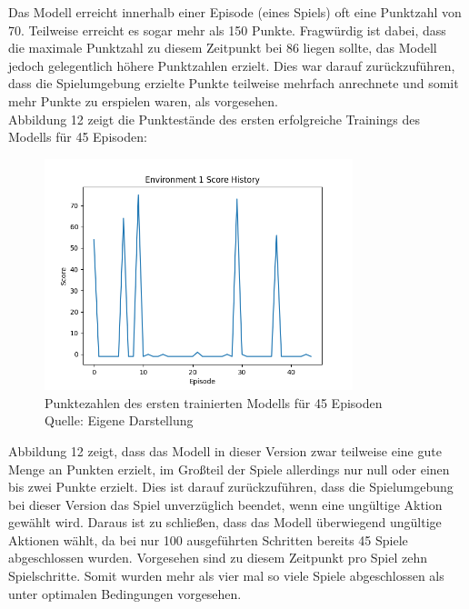 Das Modell erreicht innerhalb einer Episode (eines Spiels) oft eine Punktzahl von 70. Teilweise erreicht es sogar mehr als 150 Punkte. Fragwürdig ist dabei, dass die maximale Punktzahl zu diesem Zeitpunkt bei 86 liegen sollte, das Modell jedoch gelegentlich höhere Punktzahlen erzielt. Dies war darauf zurückzuführen, dass die Spielumgebung erzielte Punkte teilweise mehrfach anrechnete und somit mehr Punkte zu erspielen waren, als vorgesehen.\\

Abbildung 12 zeigt die Punktestände des ersten erfolgreiche Trainings des Modells für 45 Episoden:
\nopagebreak
\begin{figure}[H]
	\centering
	\includegraphics[width=0.8\textwidth]{Bilder/firstpropertraining100steps} 
	\caption[Punktezahlen des ersten trainierten Modells für 45 Episoden]{Punktezahlen des ersten trainierten Modells für 45 Episoden\\ Quelle: Eigene Darstellung}
\end{figure}

Abbildung 12 zeigt, dass das Modell in dieser Version zwar teilweise eine gute Menge an Punkten erzielt, im Großteil der Spiele allerdings nur null oder einen bis zwei Punkte erzielt. Dies ist darauf zurückzuführen, dass die Spielumgebung bei dieser Version das Spiel unverzüglich beendet, wenn eine ungültige Aktion gewählt wird. Daraus ist zu schließen, dass das Modell überwiegend ungültige Aktionen wählt, da bei nur 100 ausgeführten Schritten bereits 45 Spiele abgeschlossen wurden. Vorgesehen sind zu diesem Zeitpunkt pro Spiel zehn Spielschritte. Somit wurden mehr als vier mal so viele Spiele abgeschlossen als unter optimalen Bedingungen vorgesehen.
